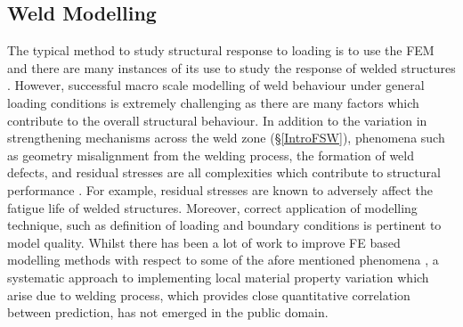 %
\subsection{Weld Modelling}
\label{IntroWeldeModelling}
The typical method to study structural response to loading is to use the FEM and there are many instances of its use to study the response of welded structures \cite{Grujicic2011,McWilliams2013,Reis2004,Zhao2001}. However, successful macro scale modelling of weld behaviour under general loading conditions is extremely challenging as there are many factors which contribute to the overall structural behaviour. In addition to the variation in strengthening mechanisms across the weld zone (\S\ref{IntroFSW}), phenomena such as geometry misalignment from the welding process, the formation of weld defects, and residual stresses are all complexities which contribute to structural performance \cite{Kim2010,Grujicic2011a}. For example, residual stresses are known to adversely affect the fatigue life of welded structures. Moreover, correct application of modelling technique, such as definition of loading and boundary conditions is pertinent to model quality.  Whilst there has been a lot of work to improve FE based modelling methods with respect to some of the afore mentioned phenomena \cite{Zadpoor2009,McWilliams2013,Grujicic2011,Grujicic2010a}, a systematic approach to implementing local material property variation which arise due to welding process, which provides close quantitative correlation between prediction, has not emerged in the public domain. 

